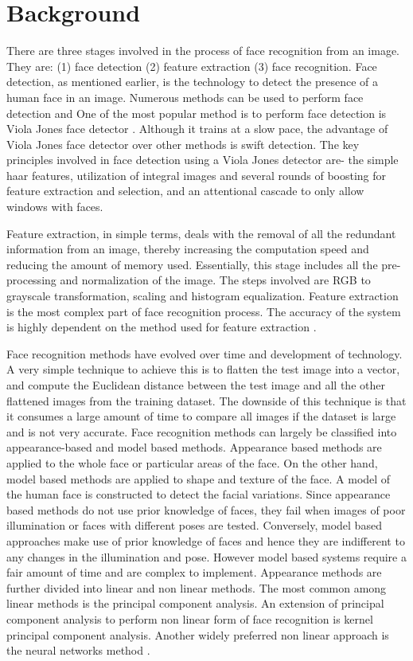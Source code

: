 \documentclass[conference]{IEEEtran}
\begin{document}
\section{Background}
\label{sec: 2.Background}

There are three stages involved in the process of face recognition from an image. They are: (1) face detection (2) feature extraction (3) face recognition. Face detection, as mentioned earlier, is the technology to detect the presence of a human face in an image. Numerous methods can be used to perform face detection and One of the most popular method is to perform face detection is Viola Jones face detector \cite{zafeiriou2015survey}. Although it trains at a slow pace, the advantage of Viola Jones face detector over other methods is swift detection. The key principles involved in face detection using a Viola Jones detector are- the simple haar features, utilization of integral images and several rounds of boosting for feature extraction and selection, and an attentional cascade to only allow windows with faces\cite{zafeiriou2015survey}.

Feature extraction, in simple terms, deals with the removal of all the redundant information from an image, thereby increasing the computation speed and reducing the amount of memory used. Essentially, this stage includes all the pre-processing and normalization of the image. The steps involved are RGB to grayscale transformation, scaling and histogram equalization. Feature extraction is the most complex part of face recognition process. The accuracy of the system is highly dependent on the method used for feature extraction \cite{brunelli1993face}.

Face recognition methods have evolved over time and development of technology. A very simple technique to achieve this is to flatten the test image into a vector, and compute the Euclidean distance between the test image and all the other flattened images from the training dataset. The downside of this technique is that it consumes a large amount of time to compare all images if the dataset is large and is not very accurate. Face recognition methods can largely be classified into appearance-based and model based methods. Appearance based methods are applied to the whole face or particular areas of the face. On the other hand, model based methods are applied to shape and texture of the face. A model of the human face is constructed to detect the facial variations. Since appearance based methods do not use prior knowledge of faces, they fail when images of poor illumination or faces with different poses are tested. Conversely, model based approaches  make use of prior knowledge of faces and hence they are indifferent to any changes in the illumination and pose. However model based systems require a fair amount of time and are complex to implement. Appearance methods are further divided into linear and non linear methods. The most common among linear methods is the principal component analysis. An extension of principal component analysis to perform non linear form of face recognition is kernel principal component analysis. Another widely preferred non linear approach is the neural networks method \cite{agrawal2015evaluation}.
\end{document}
